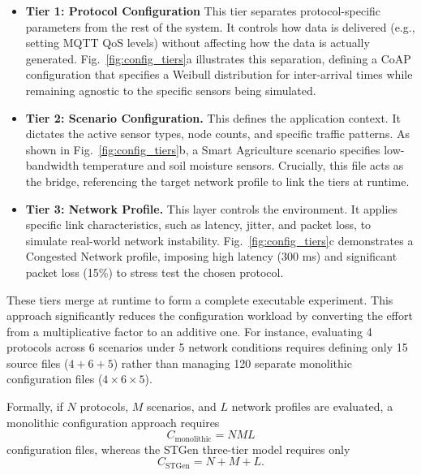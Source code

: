 \documentclass[jsan,article,submit,moreauthors,pdftex]{Definitions/mdpi}
\begin{document}
\begin{itemize}
    \item \textbf{Tier 1: Protocol Configuration} This tier separates protocol-specific parameters from the rest of the system. It controls how data is delivered (e.g., setting MQTT QoS levels) without affecting how the data is actually generated. Fig.~\ref{fig:config_tiers}a illustrates this separation, defining a CoAP configuration that specifies a Weibull distribution for inter-arrival times while remaining agnostic to the specific sensors being simulated.
    
    \item \textbf{Tier 2: Scenario Configuration.} This defines the application context. It dictates the active sensor types, node counts, and specific traffic patterns. As shown in Fig.~\ref{fig:config_tiers}b, a Smart Agriculture scenario specifies low-bandwidth temperature and soil moisture sensors. Crucially, this file acts as the bridge, referencing the target network profile to link the tiers at runtime.

    \item \textbf{Tier 3: Network Profile.} This layer controls the environment. It applies specific link characteristics, such as latency, jitter, and packet loss, to simulate real-world network instability.   Fig.~\ref{fig:config_tiers}c demonstrates a Congested Network profile, imposing high latency (300 ms) and significant packet loss (15\%) to stress test the chosen protocol.
\end{itemize}


These tiers merge at runtime to form a complete executable experiment. This approach significantly reduces the configuration workload by converting the effort from a multiplicative factor to an additive one. For instance, evaluating 4 protocols across 6 scenarios under 5 network conditions requires defining only 15 source files ($4+6+5$) rather than managing 120 separate monolithic configuration files ($4 \times 6 \times 5$).

Formally, if $N$ protocols, $M$ scenarios, and $L$ network profiles are evaluated, a monolithic configuration approach requires
\begin{equation}
C_{\mathrm{monolithic}} = NML
\end{equation}
configuration files, whereas the STGen three-tier model requires only
\begin{equation}
C_{\mathrm{STGen}} = N + M + L .
\end{equation}
\end{document}
